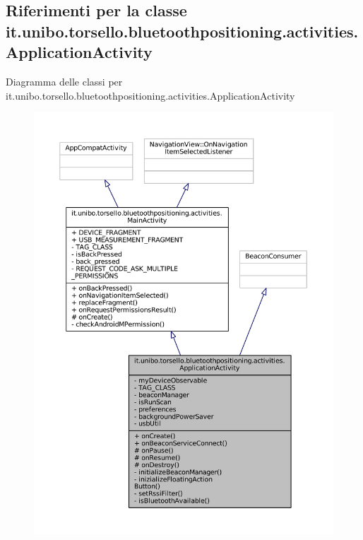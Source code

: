 \hypertarget{classit_1_1unibo_1_1torsello_1_1bluetoothpositioning_1_1activities_1_1ApplicationActivity}{}\subsection{Riferimenti per la classe it.\+unibo.\+torsello.\+bluetoothpositioning.\+activities.\+Application\+Activity}
\label{classit_1_1unibo_1_1torsello_1_1bluetoothpositioning_1_1activities_1_1ApplicationActivity}


Diagramma delle classi per it.\+unibo.\+torsello.\+bluetoothpositioning.\+activities.\+Application\+Activity
\nopagebreak
\begin{figure}[H]
\begin{center}
\leavevmode
\includegraphics[width=350pt]{classit_1_1unibo_1_1torsello_1_1bluetoothpositioning_1_1activities_1_1ApplicationActivity__inherit__graph}
\end{center}
\end{figure}



